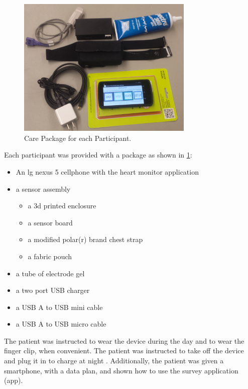 \begin{figure}
 \begin{center}
  \includegraphics[scale=1,width=0.75\textwidth]{Images/carePackage.png} 
  \caption{Care Package for each Participant.} 
  \label{fig:CarePackage}
 \end{center}
\end{figure}



Each participant was provided with a package as shown in \cref{fig:CarePackage}:
\begin{itemize}
\item An lg nexus 5 cellphone with the heart monitor application
\item a sensor assembly
	\begin{itemize}
	\item a 3d printed enclosure
	\item a sensor board
	\item a modified polar(r) brand chest strap
	\item a fabric pouch
	\end{itemize}
\item a tube of electrode gel
\item a two port USB charger
\item a USB A to USB mini cable
\item a USB A to USB micro cable
\end{itemize}

The patient was instructed to wear the device during the day and to wear the finger clip, when convenient. The patient was instructed to take off the device and plug it in to charge at night . Additionally, the patient was given a smartphone, with a data plan, and shown how to use the survey application (app). 

